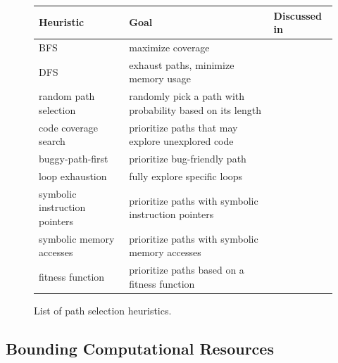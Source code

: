 \begin{figure}[t]
  \centering
  \begin{adjustbox}{width=1\columnwidth}
  \begin{small}
  \begin{tabular}{| l || l || l |}
    \hline      
    Heuristic & Goal & Discussed in \\ \hline\hline
    BFS & maximize coverage & \cite{CKC-TOCS12,PEX-TAP08} \\
    DFS & exhaust paths, minimize memory usage & \cite{EXE-CCS06,CKC-TOCS12,PEX-TAP08,DART-PLDI05} \\
    random path selection & randomly pick a path with probability based on its length & \cite{KLEE-OSDI08} \\
    code coverage search & prioritize paths that may explore unexplored code & \cite{EXE-CCS06,KLEE-OSDI08,MAYHEM-SP12,CKC-TOCS12,GV-ISSTA02} \\
    buggy-path-first & prioritize bug-friendly path  & \cite{AEG-NDSS11} \\
    loop exhaustion & fully explore specific loops  & \cite{AEG-NDSS11} \\
    symbolic instruction pointers & prioritize paths with symbolic instruction pointers & \cite{MAYHEM-SP12} \\
    symbolic memory accesses & prioritize paths with symbolic memory accesses & \cite{MAYHEM-SP12} \\ 
    fitness function & prioritize paths based on a fitness function & \cite{XTD-DSN09,CS-CACM13,XTD-DSN09} \\
    
    \hline  
  \end{tabular}
  \end{small}
  \end{adjustbox}
  \caption{List of path selection heuristics.}
  \label{tab:heuristics}
\end{figure}


\subsection{Bounding Computational Resources}
\label{heuristics}

